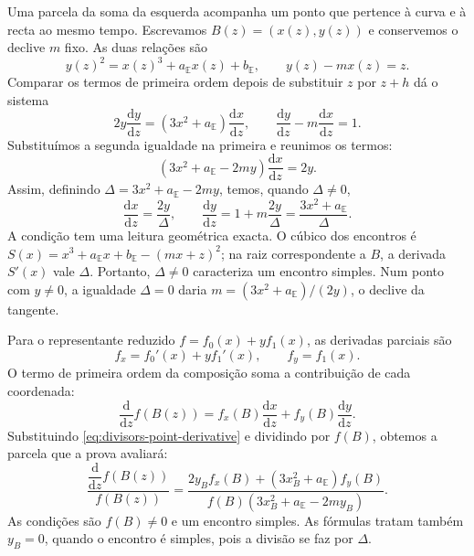 Uma parcela da soma da esquerda acompanha um ponto que pertence à curva
e à recta ao mesmo tempo. Escrevamos \(B(z)=(x(z),y(z))\) e conservemos o declive \(m\)
fixo. As duas relações são
\[
 y(z)^2=x(z)^3+a_{\mathbb E}x(z)+b_{\mathbb E},
 \qquad y(z)-mx(z)=z.
\]
Comparar os termos de primeira ordem depois de substituir \(z\) por
\(z+h\) dá o sistema
\[
 2y\frac{\mathrm dy}{\mathrm dz}
 =(3x^2+a_{\mathbb E})\frac{\mathrm dx}{\mathrm dz},
 \qquad
 \frac{\mathrm dy}{\mathrm dz}-m\frac{\mathrm dx}{\mathrm dz}=1.
\]
Substituímos a segunda igualdade na primeira e reunimos os termos:
\[
 (3x^2+a_{\mathbb E}-2my)\frac{\mathrm dx}{\mathrm dz}=2y.
\]
Assim, definindo
\(\Delta=3x^2+a_{\mathbb E}-2my\), temos, quando \(\Delta\ne0\),
\begin{equation}
 \frac{\mathrm dx}{\mathrm dz}=\frac{2y}{\Delta},
 \qquad
 \frac{\mathrm dy}{\mathrm dz}
 =1+m\frac{2y}{\Delta}
 =\frac{3x^2+a_{\mathbb E}}{\Delta}.
 \label{eq:divisors-point-derivative}
\end{equation}
A condição tem uma leitura geométrica exacta. O cúbico dos encontros é
\(S(x)=x^3+a_{\mathbb E}x+b_{\mathbb E}-(mx+z)^2\);
na raiz correspondente a \(B\), a derivada \(S'(x)\) vale
\(\Delta\). Portanto, \(\Delta\ne0\) caracteriza um encontro
simples. Num ponto com \(y\ne0\), a igualdade \(\Delta=0\)
daria \(m=(3x^2+a_{\mathbb E})/(2y)\), o declive da tangente.

Para o representante reduzido \(f=f_0(x)+yf_1(x)\), as derivadas
parciais são
\[
 f_x=f_0'(x)+yf_1'(x),\qquad f_y=f_1(x).
\]
O termo de primeira ordem da composição soma a contribuição de cada
coordenada:
\[
 \frac{\mathrm d}{\mathrm dz}f(B(z))
 =f_x(B)\frac{\mathrm dx}{\mathrm dz}
  +f_y(B)\frac{\mathrm dy}{\mathrm dz}.
\]
Substituindo \eqref{eq:divisors-point-derivative} e dividindo por
\(f(B)\), obtemos a parcela que a prova avaliará:
\begin{equation}
 \frac{\dfrac{\mathrm d}{\mathrm dz}f(B(z))}{f(B(z))}
 =\frac{2y_Bf_x(B)+(3x_B^2+a_{\mathbb E})f_y(B)}
 {f(B)(3x_B^2+a_{\mathbb E}-2my_B)}.
 \label{eq:divisors-evaluation-ratio}
\end{equation}
As condições são \(f(B)\ne0\) e um encontro simples. As fórmulas
tratam também \(y_B=0\), quando o encontro é simples, pois a divisão
se faz por \(\Delta\).

